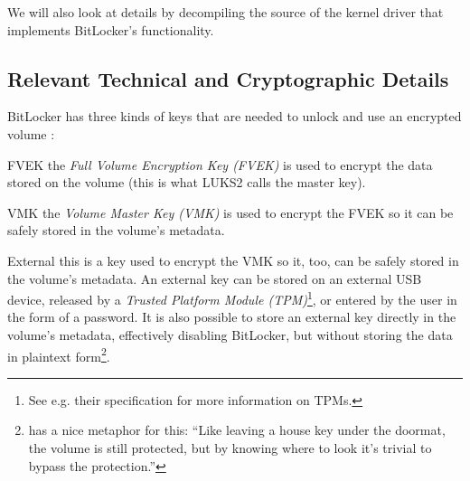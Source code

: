 We will also look at  details by decompiling the source of the kernel driver that implements BitLocker's functionality.
%

\subsection{Relevant Technical and Cryptographic Details}
\label{chap:otherapproaches.bitlocker.details}
BitLocker has three kinds of keys that are needed to unlock and use an encrypted volume \cite{Kornblum2009}:
\begin{descitemize}
	\item[FVEK] the \emph{Full Volume Encryption Key (FVEK)} is used to encrypt the data stored on the volume (this is what LUKS2 calls the master key).
	\item[VMK] the \emph{Volume Master Key (VMK)} is used to encrypt the FVEK so it can be safely stored in the volume's metadata.
	\item[External] this is a key used to encrypt the VMK so it, too, can be safely stored in the volume's metadata. An external key can be stored on an external USB device, released by a \emph{Trusted Platform Module (TPM)}\footnote{\label{fn:otherapproaches.bitlocker.tpm} See e.g. their specification \cite{Tpm2019} for more information on TPMs.}, or entered by the user in the form of a password. It is also possible to store an external key directly in the volume's metadata, effectively disabling BitLocker, but without storing the data in plaintext form\footnote{\label{fn:otherapproaches.bitlocker.doormat} \cite{Kornblum2009} has a nice metaphor for this: ``Like leaving a house key under the doormat, the volume is still protected, but by knowing where to look it's trivial to bypass the protection.''}.
\end{descitemize}

